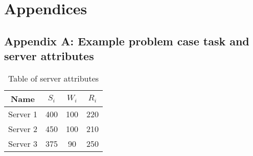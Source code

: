 \section*{Appendices}

\subsection*{Appendix A: Example problem case task and server attributes}
\label{subsec:appendix_a}
\begin{table}[h]
    \begin{tabular}{|c|c|c|c|}
        \hline
        Name     & $S_i$ & $W_i$ & $R_i$ \\ [0.5ex] \hline
        Server 1 & 400   & 100   & 220   \\ \hline
        Server 2 & 450   & 100   & 210   \\ \hline
        Server 3 & 375   & 90    & 250   \\ \hline
    \end{tabular}
    \caption{Table of server attributes}
    \label{tab:example-servers-properties}
\end{table}

